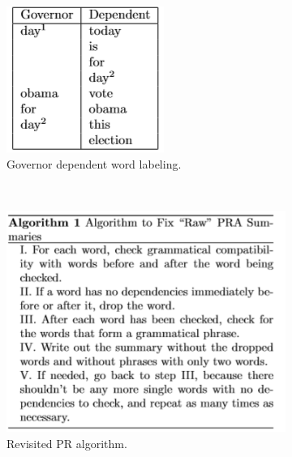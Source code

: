 \documentclass{llncs}
\begin{document}
\begin{figure}
    \centering
    \begin{subfigure}[b]{0.4\textwidth}
        \includegraphics[width=\textwidth]{fig6.png}
        \caption{Governor dependent word labeling.}
        \label{fig:fig6}
    \end{subfigure}
    ~
    \begin{subfigure}[b]{0.4\textwidth}
        \includegraphics[width=\textwidth]{fig7.png}
        \caption{Revisited PR algorithm.}
        \label{fig:fig7}
    \end{subfigure}
    \caption{\cite{judd_better_2013}}
\end{figure}
\end{document}
